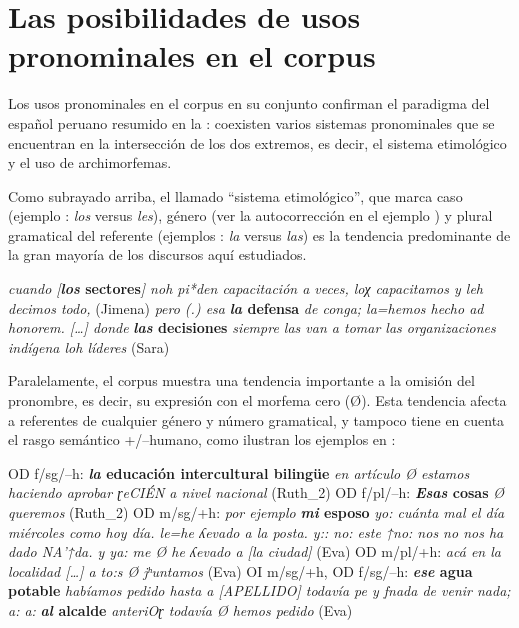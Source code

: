 \documentclass[output=paper]{../langscibook}
\begin{document}
\section{Las posibilidades de usos pronominales en el corpus}\label{sec:mick:4}

Los usos pronominales en el corpus en su conjunto confirman el paradigma del español peruano resumido en la : coexisten varios sistemas pronominales que se encuentran en la intersección de los dos extremos, es decir, el sistema etimológico y el uso de archimorfemas.

Como subrayado arriba, el llamado “sistema etimológico”, que marca caso (ejemplo : \textit{los} versus \textit{les}), género (ver la autocorrección en el ejemplo ) y plural gramatical del referente (ejemplos : \textit{la} versus \textit{las}) es la tendencia predominante de la gran mayoría de los discursos aquí estudiados. 


\ea\label{ex:mick:5}
\ea\label{ex:mick:5a} \textit{cuando [}\textbf{\textit{los} \textbf{sectores}}\textit{] noh pi*den capacitación a veces, loχ capacitamos y leh decimos todo,} (Jimena)
\ex\label{ex:mick:5b} \textit{pero (.) esa} \textbf{\textit{la} \textbf{defensa}} \textit{de conga; la=hemos hecho ad honorem. […] donde} \textbf{\textit{las} \textbf{decisiones}} \textit{siempre las van a tomar las organizaciones indígena loh líderes} (Sara)
\z
\z

Paralelamente, el corpus muestra una tendencia importante a la omisión del pronombre, es decir, su expresión con el morfema cero (Ø). Esta tendencia afecta a referentes de cualquier género y número gramatical, y tampoco tiene en cuenta el rasgo semántico +/–humano, como ilustran los ejemplos en :


\ea\label{ex:mick:6}
\ea\label{ex:mick:6a} OD f/sg/–h: \textbf{\textit{la} \textbf{educación} \textbf{intercultural} \textbf{bilingüe}} \textit{en artículo Ø estamos haciendo aprobar ɽeCIÉN a nivel nacional} (Ruth\_2)
\ex\label{ex:mick:6b} OD f/pl/–h: \textbf{\textit{Esas} \textbf{cosas}} \textit{Ø queremos} (Ruth\_2)
\ex\label{ex:mick:6c} OD m/sg/+h: \textit{por ejemplo} \textbf{\textit{mi} \textbf{esposo}} \textit{yo: cuánta mal el día miércoles como hoy día. le=he ʎevado a la posta. y:: no: este ↑no: nos no nos ha dado NA'↑da. y ya: me Ø he ʎevado a [la ciudad]} (Eva)
\ex\label{ex:mick:6d} OD m/pl/+h: \textit{acá en la localidad […] a to:s Ø jʰuntamos} (Eva)
\ex\label{ex:mick:6e} OI m/sg/+h, OD f/sg/–h: \textbf{\textit{ese} \textbf{agua} \textbf{potable}} \textit{habíamos pedido hasta a [APELLIDO] todavía pe y {\textrangle}{\textrangle}f{\textlangle}nada{\textlangle} de venir nada; a: a:} \textbf{\textit{al} \textbf{alcalde}} \textit{anteriOɽ todavía Ø hemos pedido} (Eva)
\z
\z
\end{document}

